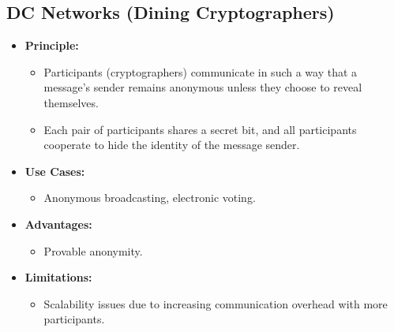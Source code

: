 \documentclass{article}
\begin{document}
\subsection{DC Networks (Dining Cryptographers)}
\begin{itemize}
    \item \textbf{Principle:}
    \begin{itemize}
        \item Participants (cryptographers) communicate in such a way that a message's sender remains anonymous unless they choose to reveal themselves.
        \item Each pair of participants shares a secret bit, and all participants cooperate to hide the identity of the message sender.
    \end{itemize}
    \item \textbf{Use Cases:}
    \begin{itemize}
        \item Anonymous broadcasting, electronic voting.
    \end{itemize}
    \item \textbf{Advantages:}
    \begin{itemize}
        \item Provable anonymity.
    \end{itemize}
    \item \textbf{Limitations:}
    \begin{itemize}
        \item Scalability issues due to increasing communication overhead with more participants.
    \end{itemize}
\end{itemize}
\end{document}

